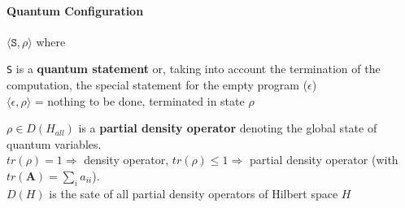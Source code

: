 \documentclass[10pt]{report}
\begin{document}
\paragraph{Quantum Configuration} $\langle \texttt{S},\rho\rangle$ where
\begin{list}{}{}
	\item \texttt{S} is a \textbf{quantum statement} or, taking into account the termination of the computation, the special statement for the empty program ($\epsilon$)\\
	$\langle \epsilon,\rho\rangle$ = nothing to be done, terminated in state $\rho$
	\item $\rho\in D(H_{all})$ is a \textbf{partial density operator} denoting the global state of quantum variables.\\
	$tr(\rho)=1\Rightarrow$ density operator, $tr(\rho)\leq 1\Rightarrow$ partial density operator (with $tr(\mathbf{A}) = \sum_i a_{ii}$).\\
	$D(H)$ is the sate of all partial density operators of Hilbert space $H$
\end{list}
\end{document}

